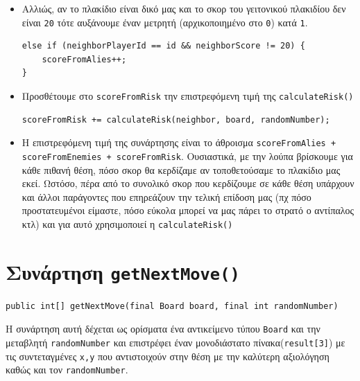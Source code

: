 \begin{itemize}
\item Αλλιώς, αν το πλακίδιο είναι δικό μας και το σκορ του γειτονικού πλακιδίου
δεν είναι \lstinline!20! τότε αυξάνουμε έναν μετρητή
(αρχικοποιημένο στο \lstinline!0!) κατά \lstinline!1!.
\begin{lstlisting}[numbers=none, aboveskip=\smallskipamount, belowskip=\smallskipamount, captionpos=none]
else if (neighborPlayerId == id && neighborScore != 20) {
    scoreFromAlies++;
}
\end{lstlisting}

\item Προσθέτουμε στο \lstinline!scoreFromRisk! την επιστρεφόμενη τιμή της \lstinline!calculateRisk()!
\begin{lstlisting}[numbers=none, aboveskip=\smallskipamount, belowskip=\smallskipamount, captionpos=none]
scoreFromRisk += calculateRisk(neighbor, board, randomNumber);
\end{lstlisting}

\item Η επιστρεφόμενη τιμή της συνάρτησης είναι το άθροισμα
\lstinline!scoreFromAlies + scoreFromEnemies + scoreFromRisk!.
Ουσιαστικά, με την λούπα βρίσκουμε για κάθε πιθανή θέση, πόσο σκορ θα κερδίζαμε αν τοποθετούσαμε το πλακίδιο μας εκεί.
Ωστόσο, πέρα από το συνολικό σκορ που κερδίζουμε σε κάθε θέση υπάρχουν και άλλοι
παράγοντες που επηρεάζουν την τελική επίδοση μας (πχ πόσο προστατευμένοι είμαστε, πόσο εύκολα μπορεί να μας πάρει το στρατό ο αντίπαλος κτλ) και για αυτό χρησιμοποιεί η \lstinline!calculateRisk()!
\end{itemize}

\section{Συνάρτηση \texttt{getNextMove()}}
\begin{lstlisting}[numbers=none, title={Declaration της συνάρτησης}]
public int[] getNextMove(final Board board, final int randomNumber)
\end{lstlisting}
Η συνάρτηση αυτή δέχεται ως ορίσματα ένα αντικείμενο τύπου \lstinline!Board! και 
την μεταβλητή \lstinline!randomNumber! και επιστρέφει έναν 
μονοδιάστατο πίνακα(\lstinline!result[3]!) με τις συντεταγμένες \lstinline!x,y! 
που αντιστοιχούν στην θέση με την καλύτερη αξιολόγηση καθώς και τον 
\lstinline!randomNumber!.

